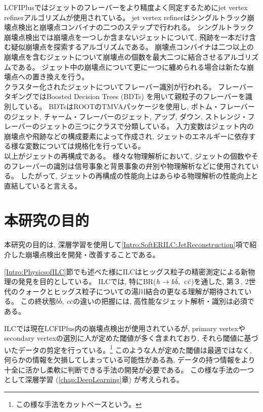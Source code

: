 LCFIPlusではジェットのフレーバーをより精度よく同定するためにjet vertex refinerアルゴリズムが使用されている。
jet vertex refinerはシングルトラック崩壊点検出と崩壊点コンバイナの二つのステップで行われる。
シングルトラック崩壊点検出では崩壊点を一つしか含まないジェットについて, 飛跡を一本だけ含む疑似崩壊点を探索するアルゴリズムである。
崩壊点コンバイナは二つ以上の崩壊点を含むジェットについて崩壊点の個数を最大二つに結合させるアルゴリズムである。
ジェット中の崩壊点について更に一つに纏められる場合は新たな崩壊点への置き換えを行う。\\

クラスター化されたジェットについてフレーバー識別が行われる。
フレーバータギングではBoosted Decision Trees (BDTs) を用いて親粒子のフレーバーを識別している。
BDTsはROOTのTMVAパッケージを使用し, ボトム・フレーバーのジェット, チャーム・フレーバーのジェット, アップ, ダウン, ストレンジ・フレーバーのジェットの三つにクラスで分類している。
入力変数はジェット内の崩壊点や飛跡などの構成要素によって作成され, ジェットのエネルギーに依存する様な変数については規格化を行っている。\\

以上がジェットの再構成である。
様々な物理解析において, ジェットの個数やそのフレーバーの識別は信号事象と背景事象の弁別や物理解析などに使用されている。
したがって, ジェットの再構成の性能向上はあらゆる物理解析の性能向上と直結していると言える。

\newpage
\section{本研究の目的} \label{Intro:Purpose}

本研究の目的は, 深層学習を使用して\ref{Intro:SoftERILC:JetReconstruction}項で紹介した崩壊点検出を開発・改善することである。

\ref{Intro:PhysicsofILC}節でも述べた様にILCはヒッグス粒子の精密測定による新物理の発見を目的としている。
ILCでは, 特にBR($\it h \to b \bar{b},\ c \bar{c}$)を通した, 第３, 2世代のクォークとヒッグス粒子についての湯川結合の更なる理解が期待されている。
この終状態$b \bar{b},\ c \bar{c}$の違いの把握には, 高性能なジェット解析・識別は必須である。

ILCでは現在LCFIPlus内の崩壊点検出が使用されているが, primary vertexやsecondary vertexの選別に人が定めた閾値が多く含まれており, それら閾値に基づいたデータの剪定を行っている。\footnote{この様な手法をカットベースという。}
このような人が定めた閾値は最適ではなく, 何らかの情報を欠損してしまっている可能性がある為, データの持つ情報をより十全に活かし柔軟に判断できる手法の開発が必要である。
この様な手法の一つとして深層学習 (\ref{chap:DeepLearning}章) が考えられる。

